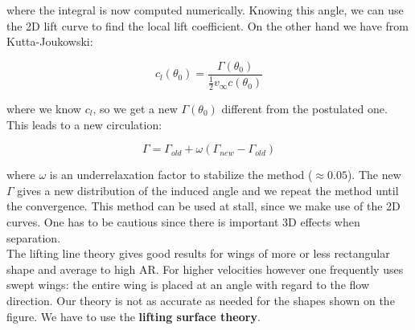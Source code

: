 	where the integral is now computed numerically. Knowing this angle, we can use the 2D lift curve to find the local lift coefficient. On the other hand we have from Kutta-Joukowski:
	
	\begin{equation}
	c_l (\theta _0) = \frac{\Gamma (\theta _0)}{\frac{1}{2}v_\infty c(\theta _0)}
	\end{equation}
	
	where we know $c_l$, so we get a new $\Gamma (\theta _0)$ different from the postulated one. This leads to a new circulation:
	
	\begin{equation}
	\Gamma = \Gamma _{old} + \omega (\Gamma _{new} - \Gamma _{old})
	\end{equation}
	
	where $\omega$ is an underrelaxation factor to stabilize the method ($\approx 0.05$). The new $\Gamma$ gives a new distribution of the induced angle and we repeat the method until the convergence. This method can be used at stall, since we make use of the 2D curves. One has to be cautious since there is important 3D effects when separation. 
	\ \\
	
	The lifting line theory gives good results for wings of more or less rectangular shape and average to high AR. For higher velocities however one frequently uses swept wings: the entire wing is placed at an angle with regard to the flow direction. Our theory is not as accurate as needed for the shapes shown on the figure. We have to use the \textbf{lifting surface theory}. 